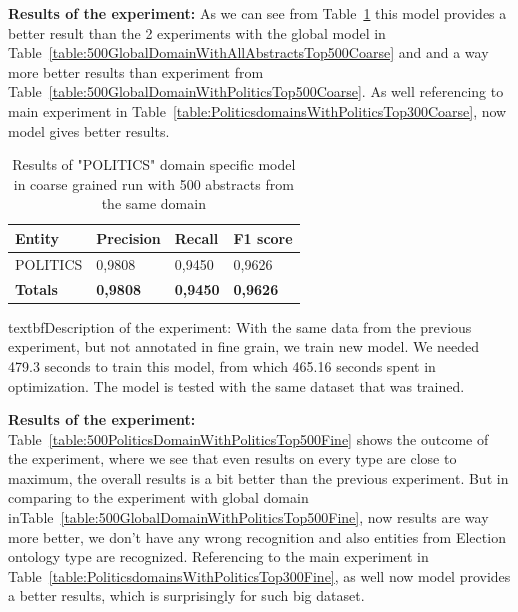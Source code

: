\documentclass[thesis=M,english]{FITthesis}[2018/05/30]
\begin{document}
	\textbf{Results of the experiment:} As we can see from Table~\ref{table:500PoliticsDomainWithPoliticsTop500Coarse} this model provides a better result than the 2 experiments with the global model in Table~\ref{table:500GlobalDomainWithAllAbstractsTop500Coarse} and and a way more better results than experiment from Table~\ref{table:500GlobalDomainWithPoliticsTop500Coarse}. As well referencing to main experiment in Table~\ref{table:PoliticsdomainsWithPoliticsTop300Coarse}, now model gives better results. 

	\begin{table}[H]\centering
		\begin{tabular}{|l|l|l|l|}
			\hline {\textbf{Entity}} & {\textbf{Precision}} & {\textbf{Recall}} & {\textbf{F1 score}}\\\hline
				POLITICS & 0,9808 & 0,9450 & 0,9626\\\hline
				\textbf{Totals} & \textbf{0,9808} & \textbf{0,9450} & \textbf{0,9626}\\\hline
		\end{tabular}
		\caption{Results of "POLITICS" domain specific model in coarse grained run with 500 abstracts from the same domain \label{table:500PoliticsDomainWithPoliticsTop500Coarse}}
	\end{table}

textbf{Description of the experiment:} With the same data from the previous experiment, but not annotated in fine grain, we train new model. We needed 479.3 seconds to train this model, from which 465.16 seconds spent in optimization. The model is tested with the same dataset that was trained.

	\textbf{Results of the experiment:} Table~\ref{table:500PoliticsDomainWithPoliticsTop500Fine} shows the outcome of the experiment, where we see that even results on every type are close to maximum, the overall results is a bit better than the previous experiment. But in comparing to the experiment with global domain inTable~\ref{table:500GlobalDomainWithPoliticsTop500Fine}, now results are way more better, we don't have any wrong recognition and also entities from Election ontology type are recognized. Referencing to the main experiment in Table~\ref{table:PoliticsdomainsWithPoliticsTop300Fine}, as well now model provides a better results, which is surprisingly for such big dataset.
\end{document}
